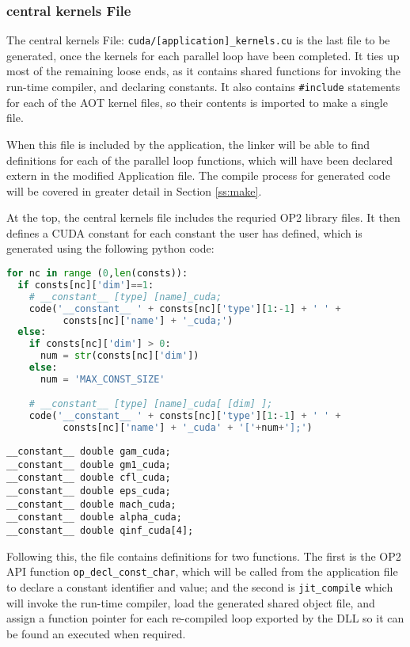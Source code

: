 \subsubsection{central kernels File}
\label{sss:mkf}
The central kernels File: \verb|cuda/[application]_kernels.cu| is the last file to be generated, once the kernels for each parallel loop have been completed. It ties up most of the remaining loose ends, as it contains shared functions for invoking the run-time compiler, and declaring constants. It also contains \verb|#include| statements for each of the AOT kernel files, so their contents is imported to make a single file.
\par
When this file is included by the application, the linker will be able to find definitions for each of the parallel loop functions, which will have been declared extern in the modified Application file. The compile process for generated code will be covered in greater detail in Section \ref{ss:make}.
\par
At the top, the central kernels file includes the requried OP2 library files. It then defines a CUDA constant for each constant the user has defined, which is generated using the following python code:\\
\begin{lstlisting}[backgroundcolor = \color{lightgray!20}, language=Python]
for nc in range (0,len(consts)):
  if consts[nc]['dim']==1:
    # __constant__ [type] [name]_cuda;
    code('__constant__ ' + consts[nc]['type'][1:-1] + ' ' +
          consts[nc]['name'] + '_cuda;')
  else:
    if consts[nc]['dim'] > 0:
      num = str(consts[nc]['dim'])
    else:
      num = 'MAX_CONST_SIZE'

    # __constant__ [type] [name]_cuda[ [dim] ];
    code('__constant__ ' + consts[nc]['type'][1:-1] + ' ' +
          consts[nc]['name'] + '_cuda' + '['+num+'];')
\end{lstlisting}
\clearpage
\begin{lstlisting}
__constant__ double gam_cuda;
__constant__ double gm1_cuda;
__constant__ double cfl_cuda;
__constant__ double eps_cuda;
__constant__ double mach_cuda;
__constant__ double alpha_cuda;
__constant__ double qinf_cuda[4];
\end{lstlisting}

Following this, the file contains definitions for two functions. The first is the OP2 API function \verb|op_decl_const_char|, which will be called from the application file to declare a constant identifier and value; and the second is \verb|jit_compile| which will invoke the run-time compiler, load the generated shared object file, and assign a function pointer for each re-compiled loop exported by the DLL so it can be found an executed when required.

